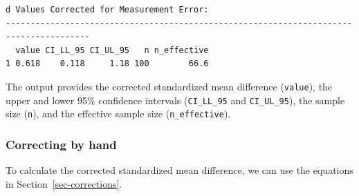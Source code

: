 \documentclass[
  letterpaper,
  DIV=11,
  numbers=noendperiod]{scrreprt}
\begin{document}
\begin{verbatim}
d Values Corrected for Measurement Error:
---------------------------------------------------------------------------------------
  value CI_LL_95 CI_UL_95   n n_effective
1 0.618    0.118     1.18 100        66.6
\end{verbatim}

The output provides the corrected standardized mean difference
(\texttt{value}), the upper and lower 95\% confidence intervals
(\texttt{CI\_LL\_95} and \texttt{CI\_UL\_95}), the sample size
(\texttt{n}), and the effective sample size (\texttt{n\_effective}).

\hypertarget{correcting-by-hand}{%
\subsubsection*{Correcting by hand}\label{correcting-by-hand}}

To calculate the corrected standardized mean difference, we can use the
equations in Section~\ref{sec-corrections}.
\end{document}
